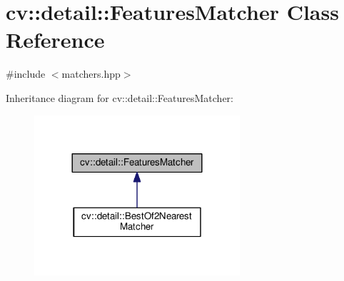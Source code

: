 \hypertarget{classcv_1_1detail_1_1FeaturesMatcher}{\section{cv\-:\-:detail\-:\-:Features\-Matcher Class Reference}
\label{classcv_1_1detail_1_1FeaturesMatcher}
}


{\ttfamily \#include $<$matchers.\-hpp$>$}



Inheritance diagram for cv\-:\-:detail\-:\-:Features\-Matcher\-:\nopagebreak
\begin{figure}[H]
\begin{center}
\leavevmode
\includegraphics[width=216pt]{classcv_1_1detail_1_1FeaturesMatcher__inherit__graph}
\end{center}
\end{figure}
